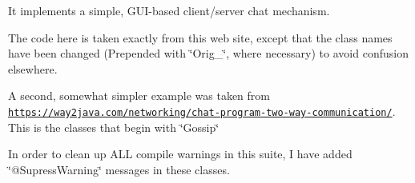 It implements a simple, G\-U\-I-\/based client/server chat mechanism. 

The code here is taken exactly from this web site, except that the class names have been changed (Prepended with \char`\"{}\-Orig\-\_\-\char`\"{}, where necessary) to avoid confusion elsewhere. 

A second, somewhat simpler example was taken from \href{https://way2java.com/networking/chat-program-two-way-communication/}{\tt https\-://way2java.\-com/networking/chat-\/program-\/two-\/way-\/communication/}. This is the classes that begin with \char`\"{}\-Gossip\char`\"{} 

In order to clean up A\-L\-L compile warnings in this suite, I have added \char`\"{}@\-Supress\-Warning\char`\"{} messages in these classes. 